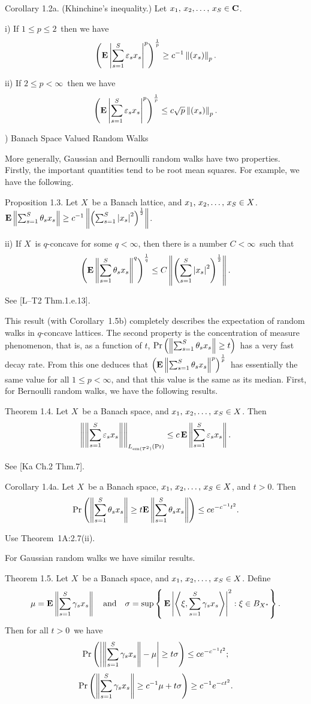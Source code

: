 \proclaim Corollary 1.2a. (Khinchine's inequality.) Let $\xS\in\C$.
\item{i)} If\/ $1\le p\le2$\ then we have
$$ \left({\bf E}\left|\sum_{s=1}^S \varepsilon_s x_s\right|^p\right)^{1\over p} \ge c^{-1} \left\| (x_s) \right\|_p .$$
\item{ii)} If\/ $2\le p<\infty$\ then we have
$$ \left({\bf E}\left|\sum_{s=1}^S \varepsilon_s x_s\right|^p\right)^{1\over p} \le c \sqrt p \left\| (x_s) \right\|_p
.$$
 
) Banach Space Valued Random Walks
 
More generally, Gaussian and Bernoulli random walks have two properties.
Firstly,
the important quantities tend to be root mean squares. For example,
we have the
following.
 
\proclaim Proposition 1.3. Let $X$\ be a Banach lattice, and $\xS\in
X$.
 ${\bf E}\left\| \sum_{s=1}^S \theta_s x_s \right\| \ge c^{-1}\left\| \left(\sum_{s=1}^S \left| x_s\right|^2\right)^{1\over2} \right\| $.
\item{ii)} If $X$\ is $q$-concave for some $q<\infty$, then there
is a number
$C<\infty$\ such that
$$ \left({\bf E}\left\| \sum_{s=1}^S \theta_s x_s \right\|^q\right)^{1\over q} \le C \left\| \left(\sum_{s=1}^S \left| x_s\right|^2\right)^{1\over2} \right\|.$$
 
\Proof See [L--T2 Thm.1.e.13].
\endproof
 
This result (with Corollary~1.5b) completely describes the expectation
of random walks in $q$-concave
lattices. The second property is the concentration of measure phenomenon,
that
is, as a function of $t$, $\mathop{\rm Pr}\nolimits\left(\left\| \sum_{s=1}^S \theta_s x_s \right\| \ge t \right)$\
has a very
fast decay rate. From this one deduces that
$\left({\bf E}\left\| \sum_{s=1}^S \theta_s x_s \right\|^p\right)^{1\over p}$\ has essentially the same
value for all
$1\le p<\infty$, and that this value is the same as its median. First,
for Bernoulli
random walks, we have the following results.
 
\proclaim Theorem 1.4. Let $X$\ be a Banach space, and $\xS\in X$.
Then
$$ \left\| \left\| \sum_{s=1}^S \varepsilon_s x_s \right\| \right\|_{L_{\mathop{\rm em}\nolimits(T^2)}(\mathop{\rm Pr}\nolimits)} \le c \,{\bf E} \left\| \sum_{s=1}^S \varepsilon_s x_s \right\|
.$$
 
\Proof
See [Ka Ch.2 Thm.7].
\endproof
 
\proclaim Corollary 1.4a. Let $X$\ be a Banach space, $\xS\in X$,
and $t>0$. Then
$$ \mathop{\rm Pr}\nolimits\left(\left\| \sum_{s=1}^S \theta_s x_s \right\| \ge t{\bf E}\left\| \sum_{s=1}^S \theta_s x_s \right\|\right) \le c e^{-c^{-1}
t^2}.$$
 
\Proof Use Theorem~1A:2.7(ii).
\endproof
 
For Gaussian random walks we have similar results.
 
\proclaim Theorem 1.5. Let $X$\ be a Banach space, and $\xS\in X$.
Define
$$ \mu={\bf E}\left\| \sum_{s=1}^S \gamma_s x_s \right\| \quad\hbox{and}\quad
   \sigma = \sup\left\{\, {\bf E}\left|\left\langle\xi,\sum_{s=1}^S \gamma_s x_s\right\rangle\right|^2
            : \xi\in B_{X^*} \right\} .$$
Then for all $t>0$\ we have
$$ \mathop{\rm Pr}\nolimits\left( \left| \left\| \sum_{s=1}^S \gamma_s x_s \right\| - \mu \right| \ge t\sigma \right)
   \le c e^{-c^{-1} t^2} ;$$
$$ \mathop{\rm Pr}\nolimits\left( \left\| \sum_{s=1}^S \gamma_s x_s \right\| \ge c^{-1} \mu + t\sigma \right)
   \ge c^{-1} e^{-ct^2} .$$
 
